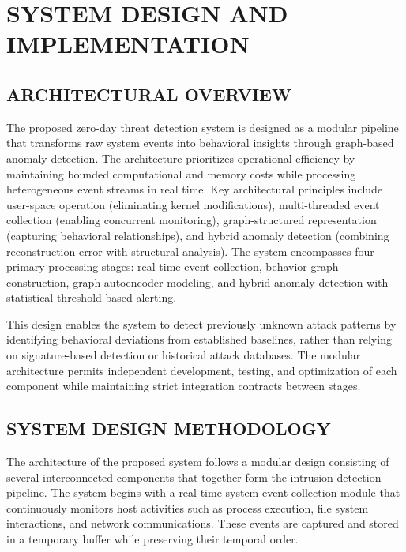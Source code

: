 

\chapter{\uppercase{SYSTEM DESIGN AND IMPLEMENTATION}}

\section{\uppercase{ARCHITECTURAL OVERVIEW}}

The proposed zero-day threat detection system is designed as a modular pipeline that transforms raw system events into behavioral insights through graph-based anomaly detection. The architecture prioritizes operational efficiency by maintaining bounded computational and memory costs while processing heterogeneous event streams in real time. Key architectural principles include user-space operation (eliminating kernel modifications), multi-threaded event collection (enabling concurrent monitoring), graph-structured representation (capturing behavioral relationships), and hybrid anomaly detection (combining reconstruction error with structural analysis). The system encompasses four primary processing stages: real-time event collection, behavior graph construction, graph autoencoder modeling, and hybrid anomaly detection with statistical threshold-based alerting.

This design enables the system to detect previously unknown attack patterns by identifying behavioral deviations from established baselines, rather than relying on signature-based detection or historical attack databases. The modular architecture permits independent development, testing, and optimization of each component while maintaining strict integration contracts between stages.

\section{\uppercase{SYSTEM DESIGN METHODOLOGY}}

The architecture of the proposed system follows a modular design consisting of several interconnected components that together form the intrusion detection pipeline. The system begins with a real-time system event collection module that continuously monitors host activities such as process execution, file system interactions, and network communications. These events are captured and stored in a temporary buffer while preserving their temporal order.

